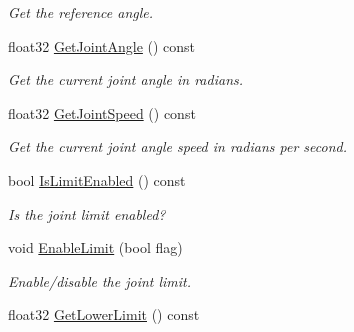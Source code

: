 \begin{DoxyCompactItemize}
\begin{DoxyCompactList}\small\item\em Get the reference angle. \end{DoxyCompactList}\item 
\hypertarget{classb2_revolute_joint_ab20fc12ce5ad5d84a032eb613c80764a}{float32 \hyperlink{classb2_revolute_joint_ab20fc12ce5ad5d84a032eb613c80764a}{Get\-Joint\-Angle} () const }\label{classb2_revolute_joint_ab20fc12ce5ad5d84a032eb613c80764a}

\begin{DoxyCompactList}\small\item\em Get the current joint angle in radians. \end{DoxyCompactList}\item 
\hypertarget{classb2_revolute_joint_a48e4db13c187af159587d731656aa0c4}{float32 \hyperlink{classb2_revolute_joint_a48e4db13c187af159587d731656aa0c4}{Get\-Joint\-Speed} () const }\label{classb2_revolute_joint_a48e4db13c187af159587d731656aa0c4}

\begin{DoxyCompactList}\small\item\em Get the current joint angle speed in radians per second. \end{DoxyCompactList}\item 
\hypertarget{classb2_revolute_joint_a7711afbfbdba4451d2dbfa8e55b9ded8}{bool \hyperlink{classb2_revolute_joint_a7711afbfbdba4451d2dbfa8e55b9ded8}{Is\-Limit\-Enabled} () const }\label{classb2_revolute_joint_a7711afbfbdba4451d2dbfa8e55b9ded8}

\begin{DoxyCompactList}\small\item\em Is the joint limit enabled? \end{DoxyCompactList}\item 
\hypertarget{classb2_revolute_joint_a56bdfdd04e906e52d0258f6a481b9093}{void \hyperlink{classb2_revolute_joint_a56bdfdd04e906e52d0258f6a481b9093}{Enable\-Limit} (bool flag)}\label{classb2_revolute_joint_a56bdfdd04e906e52d0258f6a481b9093}

\begin{DoxyCompactList}\small\item\em Enable/disable the joint limit. \end{DoxyCompactList}\item 
\hypertarget{classb2_revolute_joint_a0f33656869e46ec9405f42d68e858220}{float32 \hyperlink{classb2_revolute_joint_a0f33656869e46ec9405f42d68e858220}{Get\-Lower\-Limit} () const }\label{classb2_revolute_joint_a0f33656869e46ec9405f42d68e858220}


\end{DoxyCompactItemize}
